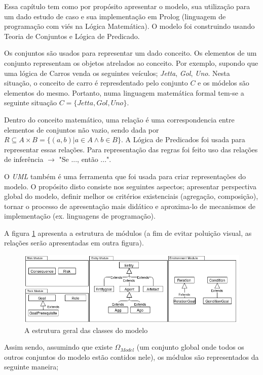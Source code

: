 Essa capítulo tem como por propósito apresentar o modelo, sua utilização para um dado estudo de caso e sua implementação 
em Prolog (linguagem de programação com viés na Lógica Matemática). O modelo foi construindo usando Teoria de Conjuntos
e Lógica de Predicado.

Os conjuntos são usados para representar um dado conceito. Os elementos de um conjunto representam os objetos atrelados ao 
conceito. Por exemplo, supondo que uma lógica de Carros venda os seguintes veículos; \textit{Jetta}, \textit{Gol}, \textit{Uno}.
Nesta situação, o conceito de carro é represdentado pelo conjunto $C$ e os módelos são elementos do mesmo. Portanto, numa linguagem
matemática formal tem-se a seguinte situação $C = \{Jetta,Gol,Uno\}$. 

Dentro do conceito matemático, uma relação é uma correspondencia entre elementos de conjuntos não vazio, sendo dada por
$R \subseteq  A \times B = \{(a,b)| a \in A \wedge b \in B \}$. A Lógica de Predicados foi usada para representar essas
relações. Para representação das regras foi feito uso das relações de inferência $\rightarrow$ "Se ..., então ...".  

O \textit{UML} também é uma ferramenta que foi usada para criar representações do modelo. O propósito disto consiste nos
seguintes aspectos; apresentar perspectiva global do modelo, definir melhor os critérios existenciais (agregação, composição),
tornar o processo de apresentação mais didático e aproxima-lo de mecanismos de implementação (ex. linguagens de programação). 

A figura \ref{module} apresenta a estrutura de módulos (a fim de evitar poluição visual, as relações serão apresentadas
em outra figura). 

\begin{figure}[H]
  \centering
  \includegraphics[width=1\linewidth]{figure/Class.png} 
  \caption{A estrutura geral das classes do modelo}
  \label{module}
\end{figure}

Assim sendo, assumindo que existe $\Omega_{Model}$ (um conjunto global onde todos os outros conjuntos do modelo estão 
contidos nele), os módulos são representados da seguinte maneira; 

